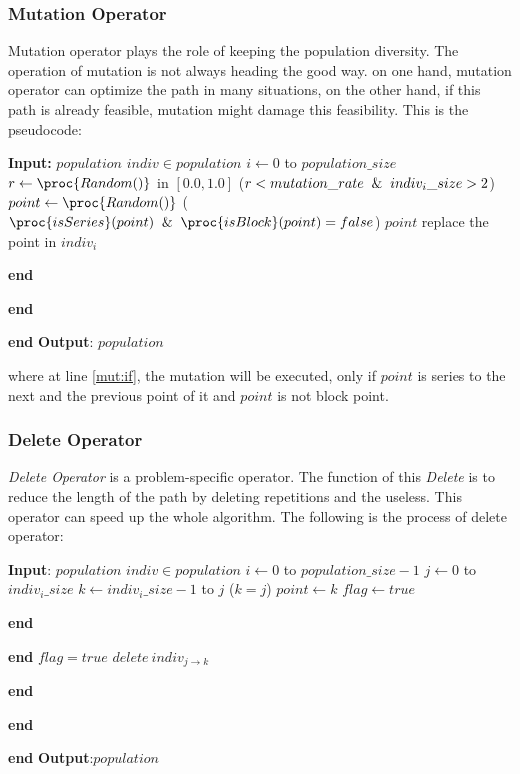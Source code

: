 \documentclass[a4paper, 11pt]{article}
\renewcommand{\End}{\kill\addtocounter{indent}{-1}\liprint\textbf{end} }
\begin{document}
\subsubsection{Mutation Operator}
Mutation operator plays the role of keeping the population diversity. The operation of mutation is not always heading the good way. on one hand, mutation operator can optimize the path in many situations, on the other hand, if this path is already feasible, mutation might damage this feasibility. %
This is the pseudocode:
\begin{codebox}
\li \textbf{Input:} $population$
\li $indiv\in population$
\li \For $i\gets 0$ to $population\_size$
\li     \Do $r\gets \proc{Random()} $ in $[0.0,1.0]$
\li         \If ($r<mutation\_rate\And indiv_i\_size> 2$)
\li             \Then $point\gets \proc{Random()}$
\li                 \If ($\proc{isSeries}(point)\And
\proc{isBlock}(point)=false$) \label{mut:if}
\li                     \Then $point$ replace the point in $indiv_i$
\li                     \End
\li             \End
\li    \End
\li \textbf{Output}: $population$
\end{codebox}
where at line \ref{mut:if}, the mutation will be executed, only if $point$ is series to the next and the previous point of it and $point$ is not block point.

\subsubsection{Delete Operator}
\emph{Delete Operator} is a problem-specific operator. The function of this \emph{Delete} is to reduce the length of the path by deleting repetitions and the useless. This operator can speed up the whole algorithm. The following is the process of delete operator:
\begin{codebox}
\li \textbf{Input}: $population$
\li $indiv\in population$
\li \For $i\gets 0$ to $population\_size-1$
\li \Do \For $j\gets 0$ to $indiv_i\_size$
\li         \Do \For $k\gets indiv_i\_size-1$ to $j$
\li             \Do \If ($k=j$)
\li                 \Then $point\gets k$
\li                       $flag\gets true$
\li                 \End
\li             \End
\li             \If $flag=true$
\li             \Then $delete\ indiv_{j\to k}$
\li             \End
\li         \End
\li \End
\li \textbf{Output}:$population$
\end{codebox}
\end{document}
